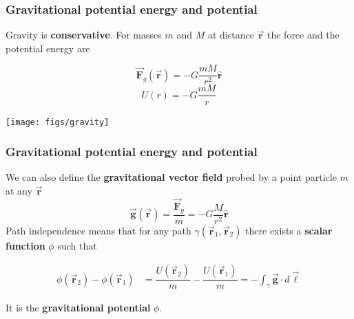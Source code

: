 \documentclass{beamer}
\newcommand{\vc}[1]{\vec{\boldsymbol{#1}}}
\newcommand{\hr}{\hat{\boldsymbol{r}}}
\begin{document}
\begin{frame}
	\frametitle{Gravitational potential energy and potential}
Gravity is \textbf{conservative}. For masses $m$ and $M$ at distance $\vc{r}$ the force and the potential energy are
\begin{block}{}
\begin{equation}
  \vc{F}_g(\vc{r}) =- G\dfrac{m M }{r^2}\hr  \end{equation}
 \begin{equation}
  U(r) = -G\dfrac{mM}{r}
\end{equation}
\end{block}

\begin{center}
	\texttt{[image: figs/gravity]}
\end{center}
\end{frame}

\begin{frame}
\frametitle{Gravitational potential energy and potential}
We can also define the \textbf{gravitational vector field} probed by a point particle $m$ at any $\vc{r}$
\begin{equation}
  \vc{g}(\vc{r}) = \dfrac{\vc{F}_g}{m}=- G\dfrac{M }{r^2}\hr 
\end{equation}\pause
Path independence means that for any path $\gamma(\vc{r}_1,\vc{r}_2)$ there exists a \textbf{scalar function} $\phi$ such that
\begin{block}{}
\begin{align}
   \phi(\vc{r}_2)-\phi(\vc{r}_1)&=\dfrac{U(\vc{r}_2)}{m}-\dfrac{U(\vc{r}_1)}{m}= -\int_{\gamma}\vc{g}\cdot d\vc{\ell}
\end{align}
\end{block}
It is the \textbf{gravitational potential} $\phi$.



%
%
%
\end{frame}
\end{document}
